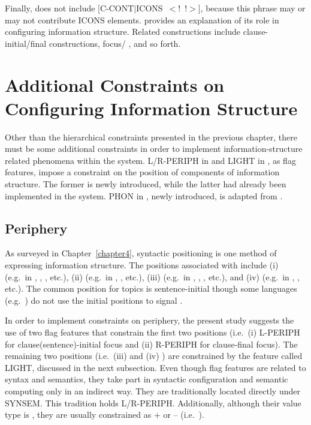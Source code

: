 \noindent Finally,  does not include
\mbox{[C-CONT{$\mid$}ICONS \ensuremath{<}!  !\ensuremath{>}]}, because
this phrase may or may not contribute ICONS
elements.  provides an explanation of its role in
configuring information structure. Related constructions include
clause-initial/final  constructions, focus/ , and so
forth.


\section{Additional Constraints on Configuring Information Structure}
\label{9:sec:other-constraints}

Other than the hierarchical constraints presented in the previous
chapter, there must be some additional constraints in order to
implement information-structure related phenomena within the \lingo
{} system.  L/R-PERIPH in 
and LIGHT in , as flag features,
impose a constraint on the position of components of information
structure. The former is newly introduced, while the latter had
already been implemented in the system. PHON in
, newly introduced, is adapted from
\citet{bildhauer:07}.


\subsection{Periphery}
\label{9:ssec:periphery}


As surveyed in Chapter~\ref{chapter4}, syntactic positioning is one
method of expressing information structure. The positions associated with  include (i)
 (e.g.\ in , ,
, etc.), (ii)  (e.g.\ in ,
, etc.), (iii)  (e.g.\ in
, , , etc.), and (iv)
 (e.g.\ in , ,
etc.). The common position for topics is sentence-initial though some
languages (e.g.\ ) do not use the initial positions to
signal .


In order to implement constraints on periphery, the present study
suggests the use of two flag features that constrain the first two
 positions (i.e.\ (i) L-PERIPH for clause(sentence)-initial focus
and (ii) R-PERIPH for clause-final
focus).
The remaining two positions (i.e.\ (iii)  and (iv)
) are constrained by the feature called
LIGHT, discussed in the next subsection.  Even though
flag features are related to syntax and semantics, they take part in
syntactic configuration and semantic computing only in an indirect
way. They are traditionally located directly under SYNSEM. This
tradition holds L/R-PERIPH. Additionally, although their value type is
, they are usually constrained as + or -- (i.e.\ ).



